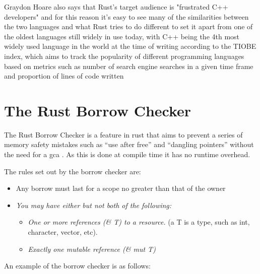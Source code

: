 \documentclass{article}
\begin{document}
Graydon Hoare also says that Rust's target audience is "frustrated C++ developers" \cite{rust-interview} and for this reason it's easy to see many of the similarities between the two languages and what Rust tries to do different to set it apart from one of the oldest languages still widely in use today, with C++ being the 4th most widely used language in the world at the time of writing according to the TIOBE index, which aims to track the popularity of different programming languages based on metrics such as number of search engine searches in a given time frame and proportion of lines of code written \cite{tiobe-index}

\section{The Rust Borrow Checker} \label{section:rust_borrow_checker}
The Rust Borrow Checker is a feature in rust that aims to prevent a series of memory safety mistakes such as ``use after free'' and ``dangling pointers'' without the need for a \gls{gca} \parencite{memory_safety_in_rust}. As this is done at compile time it has no runtime overhead.

The rules set out by the borrow checker are:
\begin{itemize}\label{rust:borrow_checker_rules}
	\item{Any borrow must last for a scope no greater than that of the owner}
	\item \emph{You may have either but not both of the following:}
	      \begin{itemize}
              \item{\emph{One or more references (\& T) to a resource.} (a T is a type, such as int, character, vector, etc).}
		      \item \emph{Exactly one mutable reference (\& mut T)}
	      \end{itemize}
          \parencite{rust_book}
\end{itemize}

An example of the borrow checker is as follows:
\end{document}
